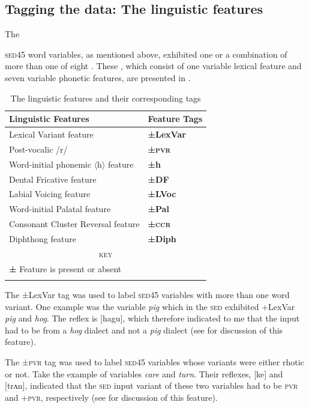 \subsection{Tagging the data: The linguistic features} \label{3.3.2}
The {\textsc{sed45} word variables, as mentioned above, exhibited one or a combination of more than one of eight . These , which consist of one variable lexical feature and seven variable phonetic features, are presented in .

\begin{table}
\begin{tabular}{ll}
\lsptoprule
Linguistic Features & Feature Tags\\
\midrule
Lexical Variant feature &  \textbf{±LexVar}\\  
Post-vocalic /r/ & \textbf{±\textsc{pvr}}  \\  
Word-initial phonemic $\langle$h$\rangle$ feature &\textbf{±h}  \\  
Dental Fricative feature & \textbf{±DF}  \\  
Labial Voicing feature & \textbf{±LVoc}  \\  
Word-initial Palatal feature & \textbf{±Pal}  \\  
Consonant Cluster Reversal feature & \textbf{±\textsc{ccr} } \\  
Diphthong feature & \textbf{±Diph } \\  
\midrule
\multicolumn{2}{c}{\textsc{key}} \\\midrule
\textbf{±}  Feature is present or absent \\
\lspbottomrule 
\end{tabular}
\caption{The linguistic features and their corresponding tags}
\label{Table 3.2}
\end{table}

The {±LexVar} tag was used to label \textsc{sed45} variables with more than one word variant. One example was the variable \emph{pig} which in the \textsc{sed} exhibited +LexVar \emph{pig}  and \emph{hog}. The  reflex is [hagu], which therefore indicated to me that the input had to be from a \emph{hog} dialect and not a \emph{pig}  dialect (see  for discussion of this feature). 

The {±\textsc{pvr}} tag was used to label \textsc{sed45} variables whose variants were either rhotic or not. Take the example of variables \emph{care} and \emph{turn}. Their  reflexes, [ke] and [trʌn], indicated that the \textsc{sed} input variant of these two variables had to be \textminus\textsc{pvr} and +\textsc{pvr}, respectively (see  for discussion of this feature).

}

